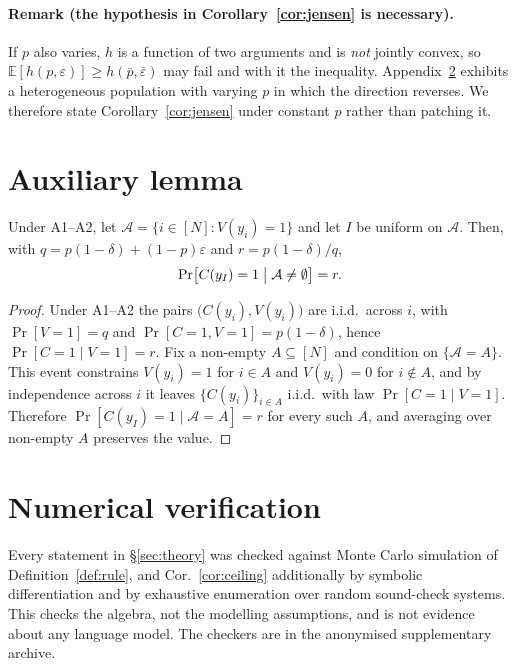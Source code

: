 \documentclass[11pt]{article}
\begin{document}
\paragraph{Remark (the hypothesis in Corollary~\ref{cor:jensen} is necessary).}
If $p$ also varies, $h$ is a function of two arguments and is \emph{not} jointly convex, so $\mathbb{E}[h(p,\varepsilon)]\ge h(\bar p,\bar\varepsilon)$ may fail and with it the inequality. Appendix~\ref{app:numeric} exhibits a heterogeneous population with varying $p$ in which the direction reverses. We therefore state Corollary~\ref{cor:jensen} under constant $p$ rather than patching it.

\section{Auxiliary lemma}\label{app:lemma}
\begin{lemma}\label{lem:precision}
Under A1--A2, let $\mathcal{A}=\{i\in[N]:V(y_i)=1\}$ and let $I$ be uniform on $\mathcal{A}$. Then, with $q=p(1-\delta)+(1-p)\varepsilon$ and $r=p(1-\delta)/q$,
\[\Pr\bigl[C(y_I)=1 \bigm| \mathcal{A}\neq\emptyset\bigr]=r .\]
\end{lemma}
\begin{proof}
Under A1--A2 the pairs $\bigl(C(y_i),V(y_i)\bigr)$ are i.i.d.\ across $i$, with $\Pr[V{=}1]=q$ and $\Pr[C{=}1,V{=}1]=p(1-\delta)$, hence $\Pr[C{=}1\mid V{=}1]=r$. Fix a non-empty $A\subseteq[N]$ and condition on $\{\mathcal{A}=A\}$. This event constrains $V(y_i)=1$ for $i\in A$ and $V(y_i)=0$ for $i\notin A$, and by independence across $i$ it leaves $\{C(y_i)\}_{i\in A}$ i.i.d.\ with law $\Pr[C{=}1\mid V{=}1]$. Therefore $\Pr[C(y_I){=}1\mid\mathcal{A}=A]=r$ for every such $A$, and averaging over non-empty $A$ preserves the value.
\end{proof}

\section{Numerical verification}\label{app:numeric}

Every statement in \S\ref{sec:theory} was checked against Monte Carlo simulation of Definition~\ref{def:rule}, and Cor.~\ref{cor:ceiling} additionally by symbolic differentiation and by exhaustive enumeration over random sound-check systems. This checks the algebra, not the modelling assumptions, and is not evidence about any language model. The checkers are in the anonymised supplementary archive.
\end{document}
